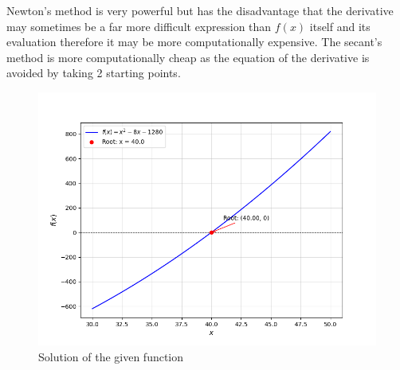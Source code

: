 \documentclass[journal]{IEEEtran}
\begin{document}
Newton's method is very powerful but has the disadvantage that the derivative may sometimes be a far more difficult expression than \(f(x)\) itself and its evaluation therefore it may be more computationally expensive. The secant's method is more computationally cheap as the equation of the derivative is avoided by taking 2 starting points.\\ 
\begin{figure}[!ht]
		\centering
		\includegraphics[width=\columnwidth]{figs/Figure_1.png}
		\caption{Solution of the given function}
		\label{stemplot}
	\end{figure}
\end{document}
